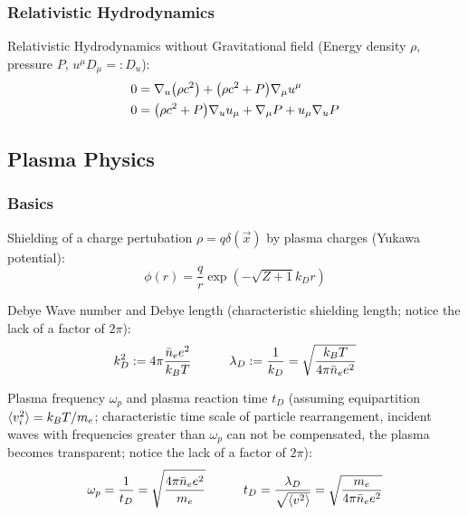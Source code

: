 		\subsubsection{Relativistic Hydrodynamics}
			Relativistic Hydrodynamics without Gravitational field (Energy density $\rho$, pressure $P$, $u^\mu D_\mu =: D_u$):
			\begin{equation}
				\begin{aligned}
					0 &= \nabla_u \qty(\rho c^2) + \qty(\rho c^2 + P) \nabla_\mu u^\mu \\
					0 &= \qty(\rho c^2 + P) \nabla_u u_\mu + \nabla_\mu P + u_\mu \nabla_u P \\
				\end{aligned}
			\end{equation}

	\subsection{Plasma Physics}
		\subsubsection{Basics}
			Shielding of a charge pertubation $\rho=q\delta(\vec{x})$ by plasma charges (Yukawa potential):
			\begin{equation}
				\phi(r) = \frac{q}{r} \exp(-\sqrt{Z+1}k_D r)
			\end{equation}

			\noindent
			Debye Wave number and Debye length (characteristic shielding length; notice the lack of a factor of $2\pi$):
			\begin{equation}
				k_D^2 := 4\pi \frac{\bar{n}_e e^2}{k_B T} \hspace{30pt} 
				\lambda_D := \frac{1}{k_D} = \sqrt{\frac{k_B T}{4\pi \bar{n}_e e^2}}
			\end{equation}

			\noindent
			Plasma frequency $\omega_p$ and plasma reaction time $t_D$ (assuming equipartition $\langle v_i^2 \rangle = k_B T / m_e$; characteristic time scale of particle rearrangement, incident waves with frequencies greater than $\omega_p$ can not be compensated, the plasma becomes transparent; notice the lack of a factor of $2\pi$):
			\begin{equation}
				\omega_p = \frac{1}{t_D} = \sqrt{\frac{4\pi\bar{n}_e e^2}{m_e}} \hspace{30pt}
				t_D = \frac{\lambda_D}{\sqrt{\langle v^2 \rangle}} = \sqrt{\frac{m_e}{4\pi \bar{n}_e e^2}} 
			\end{equation}


